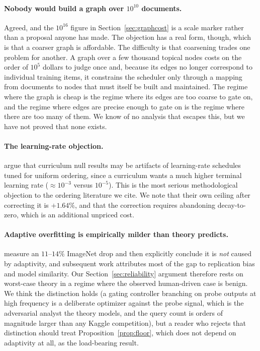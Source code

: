 \documentclass[11pt]{article}
\theoremstyle{plain}
\theoremstyle{definition}
\theoremstyle{remark}
\begin{document}
\paragraph{Nobody would build a graph over $10^{10}$ documents.} Agreed, and the
$10^{16}$ figure in Section~\ref{sec:graphcost} is a scale marker rather than a
proposal anyone has made. The objection has a real form, though, which is that a
coarser graph is affordable. The difficulty is that coarsening trades one problem
for another. A graph over a few thousand topical nodes costs on the order of
$10^5$ dollars to judge once and, because its edges no longer correspond to
individual training items, it constrains the scheduler only through a mapping
from documents to nodes that must itself be built and maintained. The regime
where the graph is cheap is the regime where its edges are too coarse to gate on,
and the regime where edges are precise enough to gate on is the regime where
there are too many of them. We know of no analysis that escapes this, but we have
not proved that none exists.

\paragraph{The learning-rate objection.} \citet{luo2025lrdecay} argue that
curriculum null results may be artifacts of learning-rate schedules tuned for
uniform ordering, since a curriculum wants a much higher terminal learning rate
($\approx 10^{-3}$ versus $10^{-5}$). This is the most serious methodological
objection to the ordering literature we cite. We note that their own ceiling
after correcting it is $+1.64\%$, and that the correction requires abandoning
decay-to-zero, which is an additional unpriced cost.

\paragraph{Adaptive overfitting is empirically milder than theory predicts.}
\citet{recht2019imagenet} measure an $11$--$14\%$ ImageNet drop and then
explicitly conclude it is \emph{not} caused by adaptivity, and subsequent work
attributes most of the gap to replication bias and model similarity. Our
Section~\ref{sec:reliability} argument therefore rests on worst-case theory in a
regime where the observed human-driven case is benign. We think the distinction
holds (a gating controller branching on probe outputs at high frequency is a
deliberate optimizer against the probe signal, which is the adversarial analyst
the theory models, and the query count is orders of magnitude larger than any
Kaggle competition), but a reader who rejects that distinction should treat
Proposition~\ref{prop:floor}, which does not depend on adaptivity at all, as the
load-bearing result.
\end{document}
